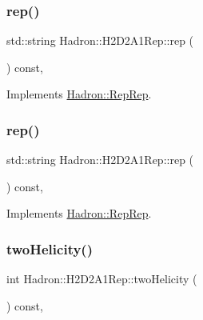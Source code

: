 \subsubsection{\texorpdfstring{rep()}{rep()}\hspace{0.1cm}{\footnotesize\ttfamily [2/3]}}
{\footnotesize\ttfamily std\+::string Hadron\+::\+H2\+D2\+A1\+Rep\+::rep (\begin{DoxyParamCaption}{ }\end{DoxyParamCaption}) const\hspace{0.3cm}{\ttfamily [inline]}, {\ttfamily [virtual]}}



Implements \mbox{\hyperlink{structHadron_1_1RepRep_ab3213025f6de249f7095892109575fde}{Hadron\+::\+Rep\+Rep}}.

\mbox{\label{structHadron_1_1H2D2A1Rep_a3280d932c7c579f85dedbde3a8e0f36f}} 
\subsubsection{\texorpdfstring{rep()}{rep()}\hspace{0.1cm}{\footnotesize\ttfamily [3/3]}}
{\footnotesize\ttfamily std\+::string Hadron\+::\+H2\+D2\+A1\+Rep\+::rep (\begin{DoxyParamCaption}{ }\end{DoxyParamCaption}) const\hspace{0.3cm}{\ttfamily [inline]}, {\ttfamily [virtual]}}



Implements \mbox{\hyperlink{structHadron_1_1RepRep_ab3213025f6de249f7095892109575fde}{Hadron\+::\+Rep\+Rep}}.

\mbox{\label{structHadron_1_1H2D2A1Rep_a9e33338f0582361895bc7b7853741335}} 
\subsubsection{\texorpdfstring{twoHelicity()}{twoHelicity()}\hspace{0.1cm}{\footnotesize\ttfamily [1/2]}}
{\footnotesize\ttfamily int Hadron\+::\+H2\+D2\+A1\+Rep\+::two\+Helicity (\begin{DoxyParamCaption}{ }\end{DoxyParamCaption}) const\hspace{0.3cm}{\ttfamily [inline]}, {\ttfamily [virtual]}}

